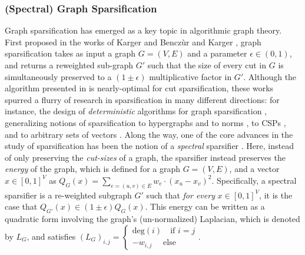 \documentclass[11pt]{article}
\theoremstyle{definition}
\newcommand{\eps}{\epsilon}
\begin{document}
\subsubsection{(Spectral) Graph Sparsification}

Graph sparsification has emerged as a key topic in algorithmic graph theory. First proposed in the works of Karger \cite{Kar93} and Bencz\`ur and Karger \cite{BK96}, graph sparsification takes as input a graph $G = (V, E)$ and a parameter $\eps \in (0,1)$, and returns a reweighted sub-graph $G'$ such that the size of every cut in $G$ is simultaneously preserved to a $(1 \pm \eps)$ multiplicative factor in $G'$. Although the algorithm presented in \cite{BK96} is nearly-optimal for cut sparsification, these works spurred a flurry of research in sparsification in many different directions: for instance, the design of \emph{deterministic} algorithms for graph sparsification \cite{BSS09}, generalizing notions of sparsification to hypergraphs \cite{KK15, CKN20, KKTY21b} and to norms \cite{JLLS23}, to CSPs \cite{KK15, KPS24}, and to arbitrary sets of vectors \cite{BrakensiekG}. Along the way, one of the core advances in the study of sparsification has been the notion of a \emph{spectral} sparsifier \cite{ST11}. Here, instead of only preserving the \emph{cut-sizes} of a graph, the sparsifier instead preserves the \emph{energy} of the graph, which is defined for a graph $G = (V, E)$, and a vector $x \in [0,1]^V$ as $Q_G(x) = \sum_{e = (u,v) \in E} w_e \cdot (x_u - x_v)^2$. Specifically, a spectral sparsifier is a re-weighted subgraph $G'$ such that \emph{for every} $x \in [0,1]^V$, it is the case that $Q_{G'}(x) \in (1 \pm \eps) Q_G(x)$. This energy can be written as a quadratic form involving the graph's (un-normalized) Laplacian, which is denoted by $L_G$, and satisfies $(L_G)_{i,j} = \begin{cases}
    \mathrm{deg}(i) \quad \text{if } i = j \\
    -w_{i,j} \quad \text{ else}
\end{cases}.$
\end{document}
